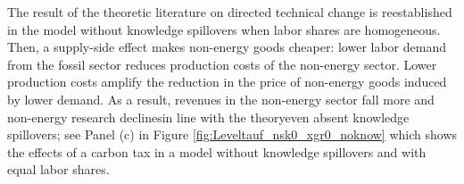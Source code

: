 	The result of the theoretic literature on directed technical change is reestablished in the model without knowledge spillovers when labor shares are homogeneous. Then, a supply-side effect makes non-energy goods  cheaper: lower labor demand from the fossil sector reduces production costs of the non-energy sector. Lower production costs amplify the reduction in the price of non-energy goods induced by lower demand.  As a result, revenues in the non-energy sector fall more and non-energy research declines\textemdash in line with the theory\textemdash even absent knowledge spillovers; see Panel (c) in Figure \ref{fig:Leveltauf_nsk0_xgr0_noknow} which shows the effects of a carbon tax in a model without knowledge spillovers and with equal labor shares. 
\clearpage
\thispagestyle{empty}
